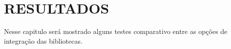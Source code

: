 
\chapter{RESULTADOS}
\label{chap:resultados}

Nesse capitulo será mostrado alguns testes comparativo entre as opções de integração das bibliotecas.

